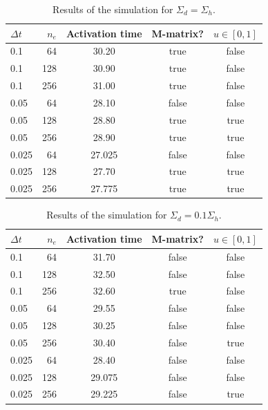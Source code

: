 \documentclass[unicode,11pt,a4paper,oneside,numbers=endperiod,openany]{article}
\begin{document}
\begin{table}[H]
	\centering
	\caption{Results of the simulation for $\Sigma_d = \Sigma_h$.}
	\begin{tabular}{l|r|ccc}
		$\Delta t$ & $n_e$ & Activation time & M-matrix? & $u \in [0, 1]$ \\
		\hline
		0.1        & 64    & 30.20           & true      & false          \\
		0.1        & 128   & 30.90           & true      & false          \\
		0.1        & 256   & 31.00           & true      & false          \\
		0.05       & 64    & 28.10           & false     & false          \\
		0.05       & 128   & 28.80           & true      & true           \\
		0.05       & 256   & 28.90           & true      & true           \\
		0.025      & 64    & 27.025          & false     & false          \\
		0.025      & 128   & 27.70           & true      & true           \\
		0.025      & 256   & 27.775          & true      & true           \\
	\end{tabular}
\end{table}

\begin{table}[H]
	\centering
	\caption{Results of the simulation for $\Sigma_d = 0.1\Sigma_h$.}
	\begin{tabular}{l|r|ccc}
		$\Delta t$ & $n_e$ & Activation time & M-matrix? & $u \in [0, 1]$ \\
		\hline
		0.1        & 64    & 31.70           & false     & false          \\
		0.1        & 128   & 32.50           & false     & false          \\
		0.1        & 256   & 32.60           & true      & false          \\
		0.05       & 64    & 29.55           & false     & false          \\
		0.05       & 128   & 30.25           & false     & false          \\
		0.05       & 256   & 30.40           & false     & true           \\
		0.025      & 64    & 28.40           & false     & false          \\
		0.025      & 128   & 29.075          & false     & false          \\
		0.025      & 256   & 29.225          & false     & true           \\
	\end{tabular}
\end{table}
\end{document}

